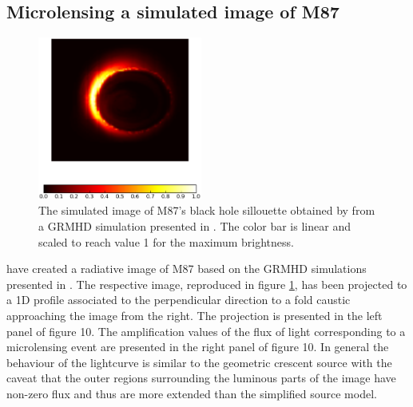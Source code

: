 \documentclass[usenatbib]{mn2e}
\begin{document}
\subsection{Microlensing a simulated image of M87}

\begin{figure}
\centering
        \includegraphics[width = 0.48\textwidth]{figures/M87_image.eps}
\caption{\label{fig:M87_image} The simulated image of M87's black hole
  sillouette obtained by \citep{2012MNRAS.421.1517D} from a GRMHD
  simulation presented in \citep{2009MNRAS.394L.126M}. The color bar
  is linear and scaled to reach value 1 for the maximum
  brightness.}
\end{figure}

\cite{2012MNRAS.421.1517D} have created a radiative image of M87 based on the GRMHD simulations presented in \citep{2009MNRAS.394L.126M}. The respective image, reproduced in figure \ref{fig:M87_image}, has been projected to a 1D profile associated to the perpendicular direction to a fold caustic approaching the image from the right. The projection is presented in the left panel of figure 10. The amplification values of the flux of light corresponding to a microlensing event are presented in the right panel of figure 10. In general the behaviour of the lightcurve is similar to the geometric crescent source with the caveat that the outer regions surrounding the luminous parts of the image have non-zero flux and thus are more extended than the simplified source model.
\end{document}
